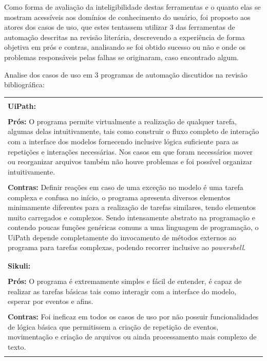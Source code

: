 \documentclass[12pt]{article}
\begin{document}
	Como forma de avaliação da inteligibilidade destas ferramentas e o quanto elas se mostram acessíveis aos domínios de conhecimento do usuário, foi proposto aos atores dos casos de uso, que estes tentassem utilizar 3 das ferramentas de automação descritas na revisão literária, descrevendo a experiência de forma objetiva em prós e contras, analisando se foi obtido sucesso ou não e onde os problemas responsáveis pelas falhas se originaram, caso encontrado algum. 
	\bigskip
	
	Analise dos casos de uso em 3 programas de automação discutidos na revisão bibliográfica:
	\bigskip

		{\centering \begin{tabular}{ | m{14cm} | }
		\hline \\
	
		{\bf UiPath:} \\ \\
		{\bf Prós:} O programa permite virtualmente a realização de qualquer tarefa, algumas delas intuitivamente, tais como construir o fluxo completo de interação com a interface dos modelos fornecendo inclusive lógica suficiente para as repetições e interações necessárias. Nos casos em que foram necessários mover ou reorganizar arquivos também não houve problemas e foi possível organizar intuitivamente. \\ \\
		{\bf Contras:} Definir reações em caso de uma exceção no modelo é uma tarefa complexa e confusa no início, o programa apresenta diversos elementos minimamente diferentes para a realização de tarefas similares, tendo elementos muito carregados e complexos. Sendo intensamente abstrato na programação e contendo poucas funções genéricas comuns a uma linguagem de programação, o UiPath depende completamente do invocamento de métodos externos ao programa para tarefas complexas, podendo recorrer inclusive ao \emph{powershell}. \\ \\
	
		\hline \hline \\
	
		{\bf Sikuli:} \\ \\
		{\bf Prós:} O programa é extremamente simples e fácil de entender, é capaz de realizar as tarefas básicas tais como interagir com a interface do modelo, esperar por eventos e afins. \\ \\
		{\bf Contras:} Foi ineficaz em todos os casos de uso por não possuir funcionalidades de lógica básica que permitissem a criação de repetição de eventos, movimentação e criação de arquivos ou ainda processamento mais complexo de texto. \\ \\
	
		\hline \end{tabular}} \\
\end{document}
